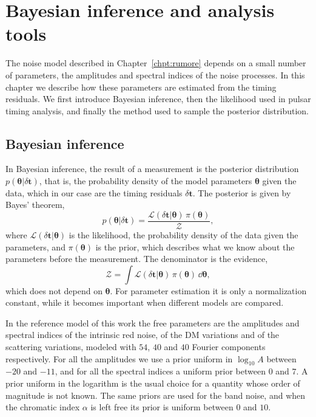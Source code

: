 \chapter{Bayesian inference and analysis tools} \label{chpt:inferenza}

The noise model described in Chapter~\ref{chpt:rumore} depends on a small
number of parameters, the amplitudes and spectral indices of the noise
processes. In this chapter we describe how these parameters are estimated from
the timing residuals. We first introduce Bayesian inference, then the
likelihood used in pulsar timing analysis, and finally the method used to
sample the posterior distribution.

\section{Bayesian inference} \label{sec:bayes}

In Bayesian inference, the result of a measurement is the posterior
distribution $p(\bm{\theta}|\delta\bm{t})$, that is, the probability density
of the model parameters $\bm{\theta}$ given the data, which in our case are the
timing residuals $\delta\bm{t}$. The posterior is given by Bayes' theorem,
\begin{equation}
    p(\bm{\theta}|\delta\bm{t}) =
    \frac{\mathcal{L}(\delta\bm{t}|\bm{\theta})\,\pi(\bm{\theta})}{\mathcal{Z}},
    \label{eq:bayes}
\end{equation}
where $\mathcal{L}(\delta\bm{t}|\bm{\theta})$ is the likelihood, the
probability density of the data given the parameters, and $\pi(\bm{\theta})$ is
the prior, which describes what we know about the parameters before the
measurement. The denominator is the evidence,
\begin{equation}
    \mathcal{Z} = \int \mathcal{L}(\delta\bm{t}|\bm{\theta})\,
    \pi(\bm{\theta})\,\dd\bm{\theta},
    \label{eq:evidence}
\end{equation}
which does not depend on $\bm{\theta}$. For parameter estimation it is only a
normalization constant, while it becomes important when different models are
compared. %

In the reference model of this work the free parameters are the amplitudes and
spectral indices of the intrinsic red noise, of the DM variations and of the
scattering variations, modeled with $54$, $40$ and $40$ Fourier components
respectively. For all the amplitudes we use a prior uniform in $\log_{10}A$
between $-20$ and $-11$, and for all the spectral indices a uniform prior
between $0$ and $7$. A prior uniform in the logarithm is the usual choice for
a quantity whose order of magnitude is not known. The same priors are used for
the band noise, and when the chromatic index $\alpha$ is left free its prior is
uniform between $0$ and $10$.

